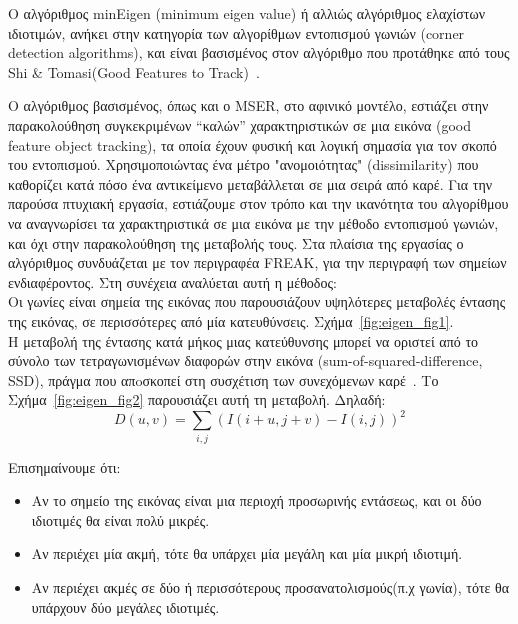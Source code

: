 Ο αλγόριθμος minEigen (minimum eigen value) ή αλλιώς αλγόριθμος ελαχίστων ιδιοτιμών, ανήκει στην κατηγορία των αλγορίθμων εντοπισμού γωνιών (corner detection algorithms), 
και είναι βασισμένος στον αλγόριθμο που προτάθηκε από τους Shi \& Tomasi(Good Features to Track)~\cite{tomasi1994good}.\par
Ο αλγόριθμος βασισμένος, όπως και ο MSER, στο αφινικό μοντέλο, εστιάζει στην παρακολούθηση συγκεκριμένων ``καλών'' χαρακτηριστικών σε μια εικόνα (good feature object tracking), 
τα οποία έχουν φυσική και λογική σημασία για τον σκοπό του εντοπισμού. Χρησιμοποιώντας ένα μέτρο "ανομοιότητας" (dissimilarity) που καθορίζει κατά πόσο
ένα αντικείμενο μεταβάλλεται σε μια σειρά από καρέ. Για την παρούσα πτυχιακή εργασία, εστιάζουμε στον τρόπο και την ικανότητα του αλγορίθμου να αναγνωρίσει τα χαρακτηριστικά σε μια εικόνα με την μέθοδο
εντοπισμού γωνιών, και όχι στην παρακολούθηση της μεταβολής τους. Στα πλαίσια της εργασίας ο αλγόριθμος συνδυάζεται με τον περιγραφέα FREAK, για την περιγραφή των σημείων ενδιαφέροντος. 
Στη συνέχεια αναλύεται αυτή η μέθοδος:\\


Οι γωνίες είναι σημεία της εικόνας που παρουσιάζουν υψηλότερες μεταβολές έντασης της εικόνας, σε περισσότερες από μία κατευθύνσεις. Σχήμα~\ref{fig:eigen_fig1}. \\
Η μεταβολή της έντασης κατά μήκος μιας κατεύθυνσης μπορεί να οριστεί από το σύνολο των τετραγωνισμένων διαφορών στην εικόνα (sum-of-squared-difference, SSD), πράγμα που απoσκοπεί στη συσχέτιση των συνεχόμενων καρέ~\cite{changcorner}. 
Το Σχήμα~\ref{fig:eigen_fig2} παρουσιάζει αυτή τη μεταβολή. Δηλαδή:
\begin{equation}
\label{eq1}
  D(u,v) = \sum_{i,j} (I(i+u,j+v)-I(i,j))^{2} 
\end{equation}


  
   
   Επισημαίνουμε ότι:
 \begin{itemize}
    

 \item Αν το σημείο της εικόνας είναι μια περιοχή προσωρινής εντάσεως, και οι δύο ιδιοτιμές θα είναι πολύ μικρές.
 \item Αν περιέχει μία ακμή, τότε θα υπάρχει μία μεγάλη και μία μικρή ιδιοτιμή.
 \item Αν περιέχει ακμές σε δύο ή περισσότερους προσανατολισμούς(π.χ γωνία), τότε θα υπάρχουν δύο μεγάλες ιδιοτιμές.
 
\end{itemize}
 
